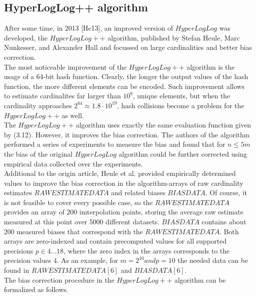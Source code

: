 \documentclass[a4paper,13pt]{article}
\theoremstyle{mytheor}
\begin{document}
\subsection*{HyperLogLog++ algorithm}
After some time, in 2013 [He13], an improved version of $HyperLogLog$ was
developed, the $HyperLogLog++$ algorithm, published by Stefan Heule,
Marc Nunkesser, and Alexander Hall and focussed on large cardinalities and better 
bias correction.\\
\indent The most noticeable improvement of the $HyperLogLog++$ algorithm
is the usage of a 64-bit hash function. Clearly, the longer the output
values of the hash function, the more different elements can be encoded.
Such improvement allows to estimate cardinalites far larger than $10^9$,
unique elements, but when the cardinality approaches $2^64 \approx 1.8\cdot 10^{19}$,
hash collisions become a problem for the $HyperLogLog++$ as well.\\
\indent The $HyperLogLog++$ algorithm uses exactly the same evaluation
function given by (3.12). However, it improves the bias correction.
The authors of the algorithm performed a series of experiments to measure
the bias and found that for $n \le 5m$ the bias of the original $HyperLogLog$ 
algorithm could be further corrected using empirical data collected over
the experiments.\\
\indent Additional to the origin article, Heule et al. provided empirically
determined values to improve the bias correction in the algorithm-arrays
of raw cardinality estimates $RAWESTIMATEDATA$ and related
biases $BIASDATA$. Of course, it is not feasible to cover every possible case,
so the $RAWESTIMATEDATA$ provides an array of 200 imterpolation
points, storing the average raw estimate measured at this point over 5000
different datasets. $BIASDATA$ contains about 200 measured biases that
correspond with the $RAWESTIMATEDATA$. Both arrays are zero-indexed
and contain precomputed values for all supported precisions $p \in 4...18$,
where the zero index in the arrays corresponds to the precision values 4.
As an example, for $m = 2^{10} and p = 10$ the needed data can be found in
$RAWESTIMATEDATA[6]$ and $BIASDATA[6]$.\\
\indent The bias correction procedure in the $HyperLogLog++$ algorithm can
be formalized as follows.\\
\end{document}
